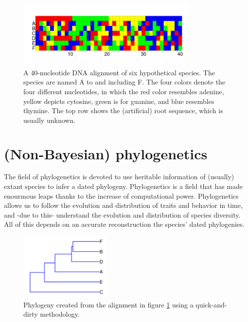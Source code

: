 {%
\begin{figure}[H]
  \includegraphics[width=0.8\textwidth]{alignment_40_with_root.png}
  \caption{
    A 40-nucleotide DNA alignment of six hypothetical species. The species
    are named A to and including F. 
    The four colors denote the four different nucleotides,
    in which the red color resembles adenine, yellow depicts cytosine, 
    green is for guanine, and blue resembles thymine. The top
    row shows the (artificial) root sequence, which is usually unknown.
  }
  \label{fig:alignment}
\end{figure}

\section{(Non-Bayesian) phylogenetics}

The field of phylogenetics is devoted to
use heritable information of (usually) extant species to
infer a dated phylogeny. Phylogenetics is a field that has
made enourmous leaps thanks to the increase of computational power.
Phylogenetics allows us to follow the evolution and distribution
of traits and behavior in time, and -due to this-
understand the evolution and distribution of species diversity.
All of this depends on an accurate reconstruction the species' dated phylogenies.

\begin{figure}[H]
  \includegraphics[width=0.4\textwidth]{phylogeny_40_upgma.png}
  \caption{
    Phylogeny created from the alignment in figure \ref{fig:alignment} 
    using a quick-and-dirty methodology.
  }
  \label{fig:phylogeny_upgma}
\end{figure}

}
